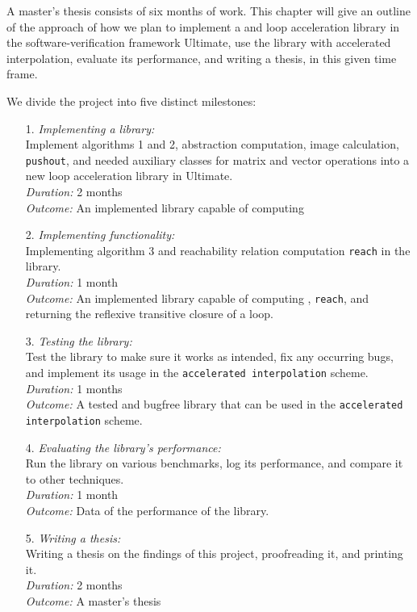 A master's thesis consists of six months of work. This chapter will give an outline of the approach of how we plan to implement a \qvasr and \qvasrs loop acceleration library in the software-verification framework Ultimate, use the library with accelerated interpolation, evaluate its performance, and writing a thesis, in this given time frame. \\ \par
We divide the project into five distinct milestones:

\begin{itemize}
	\item[1.] \textsl{Implementing a \qvasr library:} \\
               Implement algorithms 1 and 2, \qvasr abstraction computation, \qvasr image calculation, \texttt{pushout}, and needed auxiliary classes for matrix and vector operations into a new loop acceleration library in Ultimate. \\
			  \textsl{Duration:} 2 months \\
			  \textsl{Outcome:} An implemented library capable of computing \qvasr

	\item[2.] \textsl{Implementing \qvasrs functionality:} \\
               Implementing algorithm 3 and reachability relation computation \texttt{reach} in the \qvasr library. \\
			  \textsl{Duration:} 1 month \\
			  \textsl{Outcome:} An implemented library capable of computing \qvasrs, \texttt{reach}, and returning the reflexive transitive closure of a loop.

	\item[3.] \textsl{Testing the library:} \\
               Test the library to make sure it works as intended, fix any occurring bugs, and implement its usage in the \texttt{accelerated interpolation} scheme. \\
			  \textsl{Duration:} 1 months \\
			  \textsl{Outcome:} A tested and bugfree \qvasr library that can be used in the \texttt{accelerated interpolation} scheme.

	\item[4.] \textsl{Evaluating the library's performance:} \\
               Run the library on various benchmarks, log its performance, and compare it to other techniques. \\
			  \textsl{Duration:} 1 month \\
			  \textsl{Outcome:} Data of the performance of the \qvasr library.

	\item[5.] \textsl{Writing a thesis:} \\
              Writing a thesis on the findings of this project, proofreading it, and printing it. \\
			  \textsl{Duration:} 2 months \\
			  \textsl{Outcome:}	A master's thesis
\end{itemize}
